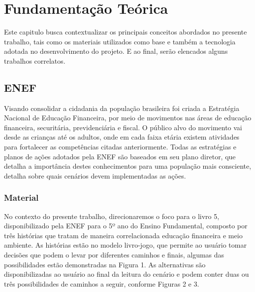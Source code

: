 \chapter{Fundamentação Teórica}
    Este capitulo busca contextualizar os principais conceitos abordados no presente trabalho, tais como os materiais
    utilizados como base e também a tecnologia adotada no desenvolvimento do projeto. E ao final, serão elencados alguns
    trabalhos correlatos.

    \section{ENEF}
        Visando consolidar a cidadania da população brasileira foi criada a Estratégia Nacional de Educação Financeira,
        por meio de movimentos nas áreas de educação financeira, securitária, previdenciária e fiscal. O público alvo do
        movimento vai desde as crianças até os adultos, onde em cada faixa etária existem atividades para fortalecer as
        competências citadas anteriormente. Todas as estratégias e planos de ações adotados pela ENEF são baseados em
        seu plano diretor, que detalha a importância destes conhecimentos para uma população mais consciente, detalha
        sobre quais cenários devem implementadas as ações.

        \subsection{Material}
            No contexto do presente trabalho, direcionaremos o foco para o livro 5, disponibilizado pela ENEF para o 5º
            ano do Ensino Fundamental, composto por três histórias que tratam de maneira correlacionada educação
            financeira e meio ambiente. As histórias estão no modelo livro-jogo, que permite ao usuário tomar decisões
            que podem o levar por diferentes caminhos e finais, algumas das possibilidades estão demonstradas na Figura 1.
            As alternativas são disponibilizadas ao usuário ao final da leitura do cenário e podem conter duas ou três
            possibilidades de caminhos a seguir, conforme Figuras 2 e 3.

